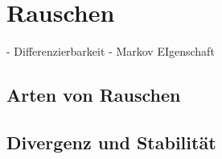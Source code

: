 %
%
%
%


\section{Rauschen\label{brown:Rauschen}}

- Differenzierbarkeit
- Markov EIgenschaft

\subsection{Arten von Rauschen\label{brown:Rauschen:Definition}}


\subsection{Divergenz und Stabilität\label{brown:Rauschen:Stabilität}}


